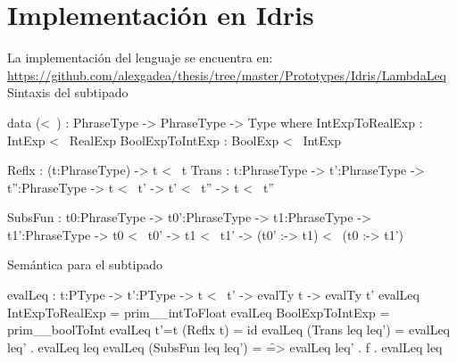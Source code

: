 \section{Implementaci\'on en Idris}

La implementaci\'on del lenguaje se encuentra en:\\
\url{https://github.com/alexgadea/thesis/tree/master/Prototypes/Idris/LambdaLeq}\\

\noindent
Sintaxis del subtipado
\begin{code}
data (<~) : PhraseType -> PhraseType -> Type where
    IntExpToRealExp : IntExp  <~ RealExp
    BoolExpToIntExp : BoolExp <~ IntExp
    
    Reflx : (t:PhraseType) -> t <~ t
    Trans : {t:PhraseType} -> {t':PhraseType} -> {t'':PhraseType} -> 
            t <~ t' -> t' <~ t'' -> t <~ t''
            
    SubsFun : {t0:PhraseType} -> {t0':PhraseType} -> 
              {t1:PhraseType} -> {t1':PhraseType} -> 
              t0 <~ t0' -> t1 <~ t1' -> (t0' :-> t1) <~ (t0 :-> t1')
\end{code}

\noindent Sem\'antica para el subtipado
\begin{code}
evalLeq : {t:PType} -> {t':PType} -> t <~ t' -> evalTy t -> evalTy t'
evalLeq IntExpToRealExp    = prim__intToFloat
evalLeq BoolExpToIntExp    = prim__boolToInt
evalLeq {t'=t} (Reflx t)   = id
evalLeq (Trans leq leq')   = evalLeq leq' . evalLeq leq
evalLeq (SubsFun leq leq') = \f => evalLeq leq' . f . evalLeq leq
\end{code}

